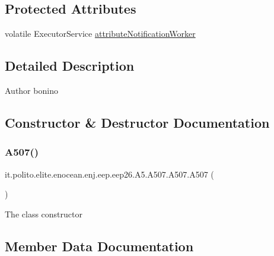 \subsection*{Protected Attributes}
\begin{DoxyCompactItemize}
\item 
volatile Executor\+Service \hyperlink{classit_1_1polito_1_1elite_1_1enocean_1_1enj_1_1eep_1_1eep26_1_1_a5_1_1_a507_1_1_a507_aed39e4e2bc9e1ce9144d796a0e8742d8}{attribute\+Notification\+Worker}
\end{DoxyCompactItemize}


\subsection{Detailed Description}
\begin{DoxyAuthor}{Author}
bonino 
\end{DoxyAuthor}


\subsection{Constructor \& Destructor Documentation}
\hypertarget{classit_1_1polito_1_1elite_1_1enocean_1_1enj_1_1eep_1_1eep26_1_1_a5_1_1_a507_1_1_a507_aa2b2dd9ef0ba108883d87e950f6f70e8}{}\label{classit_1_1polito_1_1elite_1_1enocean_1_1enj_1_1eep_1_1eep26_1_1_a5_1_1_a507_1_1_a507_aa2b2dd9ef0ba108883d87e950f6f70e8} 
\subsubsection{\texorpdfstring{A507()}{A507()}}
{\footnotesize\ttfamily it.\+polito.\+elite.\+enocean.\+enj.\+eep.\+eep26.\+A5.\+A507.\+A507.\+A507 (\begin{DoxyParamCaption}{ }\end{DoxyParamCaption})}

The class constructor 

\subsection{Member Data Documentation}
\hypertarget{classit_1_1polito_1_1elite_1_1enocean_1_1enj_1_1eep_1_1eep26_1_1_a5_1_1_a507_1_1_a507_aed39e4e2bc9e1ce9144d796a0e8742d8}{}\label{classit_1_1polito_1_1elite_1_1enocean_1_1enj_1_1eep_1_1eep26_1_1_a5_1_1_a507_1_1_a507_aed39e4e2bc9e1ce9144d796a0e8742d8} 
